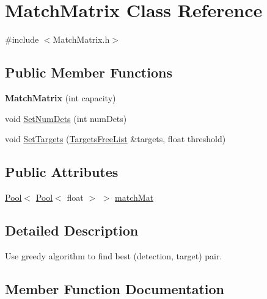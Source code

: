 \hypertarget{classMatchMatrix}{}\section{Match\+Matrix Class Reference}
\label{classMatchMatrix}


{\ttfamily \#include $<$Match\+Matrix.\+h$>$}

\subsection*{Public Member Functions}
\begin{DoxyCompactItemize}
\item 
\hypertarget{classMatchMatrix_a7d879e8c199fb12bdf820d0ddf4989bd}{}{\bfseries Match\+Matrix} (int capacity)\label{classMatchMatrix_a7d879e8c199fb12bdf820d0ddf4989bd}

\item 
void \hyperlink{classMatchMatrix_acec2501fa6829ffc411d6a28f81a9fd4}{Set\+Num\+Dets} (int num\+Dets)
\item 
void \hyperlink{classMatchMatrix_af831fe20d5065558e866ca4cc7494c5d}{Set\+Targets} (\hyperlink{classTargetsFreeList}{Targets\+Free\+List} \&targets, float threshold)
\end{DoxyCompactItemize}
\subsection*{Public Attributes}
\begin{DoxyCompactItemize}
\item 
\hyperlink{classPool}{Pool}$<$ \hyperlink{classPool}{Pool}$<$ float $>$ $>$ \hyperlink{classMatchMatrix_a98f6c92d3df7bbf59f0db47c2cdffd2b}{match\+Mat}
\end{DoxyCompactItemize}


\subsection{Detailed Description}
Use greedy algorithm to find best (detection, target) pair. 

\subsection{Member Function Documentation}
\hypertarget{classMatchMatrix_acec2501fa6829ffc411d6a28f81a9fd4}{}
